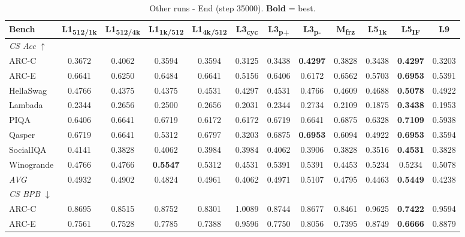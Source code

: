 \begin{table}[htbp]
\centering
\setlength{\tabcolsep}{2.5pt}
\small
\caption{Other runs - End (step 35000). \textbf{Bold} = best.}
\label{tab:other_end}
\begin{tabular}{lccccccccccc}
\toprule
Bench & L1\textsubscript{512/1k} & L1\textsubscript{512/4k} & L1\textsubscript{1k/512} & L1\textsubscript{4k/512} & L3\textsubscript{cyc} & L3\textsubscript{p+} & L3\textsubscript{p-} & M\textsubscript{frz} & L5\textsubscript{1k} & L5\textsubscript{IF} & L9 \\
\midrule
\multicolumn{12}{l}{\textit{CS Acc} $\uparrow$} \\
ARC-C & 0.3672 & 0.4062 & 0.3594 & 0.3594 & 0.3125 & 0.3438 & \textbf{0.4297} & 0.3828 & 0.3438 & \textbf{0.4297} & 0.3203 \\
ARC-E & 0.6641 & 0.6250 & 0.6484 & 0.6641 & 0.5156 & 0.6406 & 0.6172 & 0.6562 & 0.5703 & \textbf{0.6953} & 0.5391 \\
HellaSwag & 0.4766 & 0.4375 & 0.4375 & 0.4531 & 0.4297 & 0.4531 & 0.4766 & 0.4609 & 0.4688 & \textbf{0.5078} & 0.4922 \\
Lambada & 0.2344 & 0.2656 & 0.2500 & 0.2656 & 0.2031 & 0.2344 & 0.2734 & 0.2109 & 0.1875 & \textbf{0.3438} & 0.1953 \\
PIQA & 0.6406 & 0.6641 & 0.6719 & 0.6172 & 0.6172 & 0.6719 & 0.6641 & 0.6875 & 0.6328 & \textbf{0.7109} & 0.5938 \\
Qasper & 0.6719 & 0.6641 & 0.5312 & 0.6797 & 0.3203 & 0.6875 & \textbf{0.6953} & 0.6094 & 0.4922 & \textbf{0.6953} & 0.3594 \\
SocialIQA & 0.4141 & 0.3828 & 0.4062 & 0.3984 & 0.3984 & 0.4062 & 0.3906 & 0.3828 & 0.3516 & \textbf{0.4531} & 0.3828 \\
Winogrande & 0.4766 & 0.4766 & \textbf{0.5547} & 0.5312 & 0.4531 & 0.5391 & 0.5391 & 0.4453 & 0.5234 & 0.5234 & 0.5078 \\
\textit{AVG} & 0.4932 & 0.4902 & 0.4824 & 0.4961 & 0.4062 & 0.4971 & 0.5107 & 0.4795 & 0.4463 & \textbf{0.5449} & 0.4238 \\
\midrule
\multicolumn{12}{l}{\textit{CS BPB} $\downarrow$} \\
ARC-C & 0.8695 & 0.8515 & 0.8752 & 0.8301 & 1.0089 & 0.8744 & 0.8677 & 0.8461 & 0.9625 & \textbf{0.7422} & 0.9594 \\
ARC-E & 0.7561 & 0.7528 & 0.7785 & 0.7388 & 0.9596 & 0.7750 & 0.8056 & 0.7395 & 0.8749 & \textbf{0.6666} & 0.8879 \\

\end{tabular}
\end{table}
